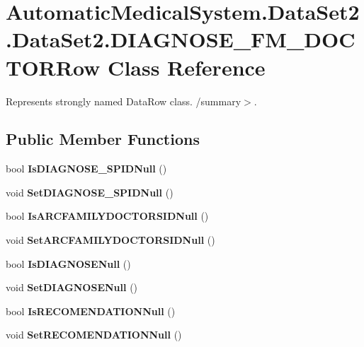 \section{AutomaticMedicalSystem.DataSet2.DataSet2.DIAGNOSE\_\-FM\_\-DOCTORRow Class Reference}
\label{class_automatic_medical_system_1_1_data_set2_1_1_d_i_a_g_n_o_s_e___f_m___d_o_c_t_o_r_row}
Represents strongly named DataRow class. /summary$>$.  


\subsection*{Public Member Functions}
\begin{CompactItemize}
\item 
bool \textbf{IsDIAGNOSE\_\-SPIDNull} ()\label{class_automatic_medical_system_1_1_data_set2_1_1_d_i_a_g_n_o_s_e___f_m___d_o_c_t_o_r_row_ecd348498d9807175f5a7949ae2827ef}

\item 
void \textbf{SetDIAGNOSE\_\-SPIDNull} ()\label{class_automatic_medical_system_1_1_data_set2_1_1_d_i_a_g_n_o_s_e___f_m___d_o_c_t_o_r_row_07eaad08b9b26820d95d265cf3564eeb}

\item 
bool \textbf{IsARCFAMILYDOCTORSIDNull} ()\label{class_automatic_medical_system_1_1_data_set2_1_1_d_i_a_g_n_o_s_e___f_m___d_o_c_t_o_r_row_939e293896138fb560a38649bd42e454}

\item 
void \textbf{SetARCFAMILYDOCTORSIDNull} ()\label{class_automatic_medical_system_1_1_data_set2_1_1_d_i_a_g_n_o_s_e___f_m___d_o_c_t_o_r_row_aa7a8b7bb1070e904d755a8a79cd0672}

\item 
bool \textbf{IsDIAGNOSENull} ()\label{class_automatic_medical_system_1_1_data_set2_1_1_d_i_a_g_n_o_s_e___f_m___d_o_c_t_o_r_row_4e6d1ce3190de0d7ea679607fd0c4c4f}

\item 
void \textbf{SetDIAGNOSENull} ()\label{class_automatic_medical_system_1_1_data_set2_1_1_d_i_a_g_n_o_s_e___f_m___d_o_c_t_o_r_row_4eca553d72321a4638b95efb6ac86c55}

\item 
bool \textbf{IsRECOMENDATIONNull} ()\label{class_automatic_medical_system_1_1_data_set2_1_1_d_i_a_g_n_o_s_e___f_m___d_o_c_t_o_r_row_67afd413530d8097a613775d1f729606}

\item 
void \textbf{SetRECOMENDATIONNull} ()\label{class_automatic_medical_system_1_1_data_set2_1_1_d_i_a_g_n_o_s_e___f_m___d_o_c_t_o_r_row_1f3ffc16168e37b79a6411a6c071a17b}

\end{CompactItemize}
